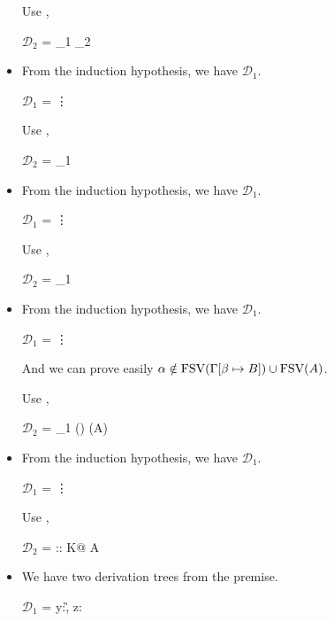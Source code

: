 \begin{itemize}
	Use \KConv,

	$\mathcal{D}_2$ = 
	{_1 \andalso {}_2}

	\item \KTW

	From the induction hypothesis, we have $\mathcal{D}_1$.

	$\mathcal{D}_1$ = 
	{\vdots}

	Use \KTW,

	$\mathcal{D}_2$ = 
	{_1}

	\item \KTWL

	From the induction hypothesis, we have $\mathcal{D}_1$.

	$\mathcal{D}_1$ = 
	{\vdots}

	Use \KTWL,

	$\mathcal{D}_2$ = 
	{_1}

	\item \KGen

	From the induction hypothesis, we have $\mathcal{D}_1$.

	$\mathcal{D}_1$ = 
	{\vdots}

	And we can prove easily $\alpha \notin \text{FSV}(\Gamma[\beta \mapsto B]) \cup \text{FSV}(A)$.

	Use \KGen,

	$\mathcal{D}_2$ = 
	{_1 \andalso \alpha \notin \FTV(\GG) \cup \FTV(A)}

	\item \KCsp

	From the induction hypothesis, we have $\mathcal{D}_1$.

	$\mathcal{D}_1$ = 
	{\vdots}

	Use \KCsp,

	$\mathcal{D}_2$ = 
	{\GGV \tau\SB :: K\SB @ A}

\fi

\item \TVar

We have two derivation trees from the premise.

$\mathcal{D}_1$ = 
{y:\tau@A \in \G, z:\xi@B  \andalso {}}


\end{itemize}
